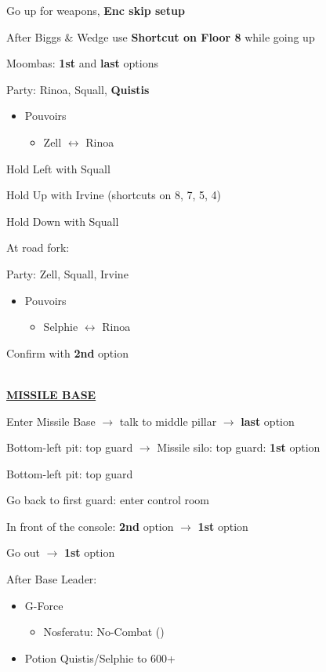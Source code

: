 Go up for weapons, \textbf{Enc skip setup}

After Biggs \& Wedge use \textbf{Shortcut on Floor 8} while going up

Moombas: \textbf{1st} and \textbf{last} options

Party: Rinoa, Squall, \textbf{Quistis}
\begin{itemize}
	\item Pouvoirs
		\begin{itemize}
			\item Zell $\leftrightarrow$ Rinoa
		\end{itemize}
\end{itemize}

Hold Left with Squall

Hold Up with Irvine (shortcuts on 8, 7, 5, 4)

Hold Down with Squall

At road fork:

Party: Zell, Squall, Irvine
\begin{itemize}
	\item Pouvoirs
		\begin{itemize}
			\item Selphie $\leftrightarrow$ Rinoa
		\end{itemize}
\end{itemize}

Confirm with \textbf{2nd} option

\leavevmode\\
\underline{\textbf{MISSILE BASE}}

Enter Missile Base $\rightarrow$ talk to middle pillar $\rightarrow$ \textbf{last} option

Bottom-left pit: top guard $\rightarrow$ Missile silo: top guard: \textbf{1st} option

Bottom-left pit: top guard

Go back to first guard: enter control room

In front of the console: \textbf{2nd} option $\rightarrow$ \textbf{1st} option

Go out $\rightarrow$ \textbf{1st} option

After Base Leader:
\begin{menu}
	\begin{itemize}
		\item G-Force
			\begin{itemize}
				\item Nosferatu: No-Combat ()
			\end{itemize}
		\item Potion Quistis/Selphie to 600+
	\end{itemize}
\end{menu}

